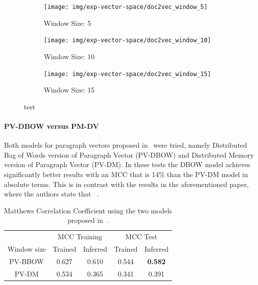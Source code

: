 \begin{figure}[h!]
    \centering
    \begin{subfigure}[b]{0.49\textwidth}
      \texttt{[image: img/exp-vector-space/doc2vec\_window\_5]}
      \caption{Window Size: 5}
\label{fig:doc2vec_window_5}
    \end{subfigure}
    \begin{subfigure}[b]{0.49\textwidth}
      \texttt{[image: img/exp-vector-space/doc2vec\_window\_10]}
    \caption{Window Size: 10}
\label{fig:doc2vec_window_10}
    \end{subfigure}
    \begin{subfigure}[b]{0.49\textwidth}
      \texttt{[image: img/exp-vector-space/doc2vec\_window\_15]}
      \caption{Window Size: 15}
\label{fig:doc2vec_window_15}
  \end{subfigure}
\caption{test}
\label{fig:window}
\end{figure}


\paragraph{PV-DBOW versus PM-DV}
Both models for paragraph vectors proposed in~\cite{Le:2014aa} were tried, namely Distributed Bag of Words version of Paragraph Vector (PV-DBOW) and Distributed Memory version of Paragraph Vector (PV-DM). In these tests the DBOW model achieves significantly better results with an MCC that is 14\% than the PV-DM model in absolute terms. This is in contrast with the results in the aforementioned paper, where the authors state that ~\cite{Le:2014aa}.

\begin{table}[h]
  \begin{center}
    \begin{tabular}{ c | *2c | *2c }
      \toprule
       & \multicolumn{2}{c|}{MCC Training} & \multicolumn{2}{|c}{MCC Test}\\
      Window size & Trained & Inferred & Trained & Inferred \\
      \midrule
      PV-BBOW & 0.627 & 0.610 & 0.544 & \textbf{0.582} \\
      PV-DM   & 0.534 & 0.365 & 0.341 & 0.391 \\
    \bottomrule
    \end{tabular}
    \caption{Matthews Correlation Coefficient using the two models proposed in~\cite{Le:2014aa}.}
\label{tab:Paragraph Vector Parameter Results PV-DBOW versus PM-DV}
\end{center}
\end{table}

